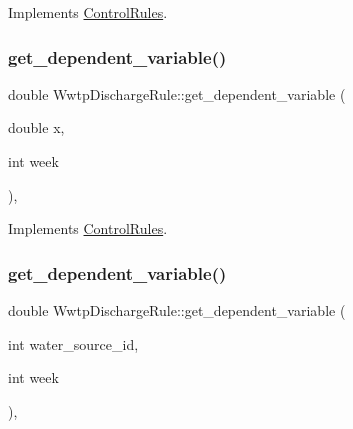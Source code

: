 Implements \mbox{\hyperlink{classControlRules_a56a42b40bf093237929a9c835dc9b772_a56a42b40bf093237929a9c835dc9b772}{Control\+Rules}}.

\mbox{\label{classWwtpDischargeRule_a10eb6f901b6479dadc107e0a7c07e03b_a10eb6f901b6479dadc107e0a7c07e03b}} 
\subsubsection{\texorpdfstring{get\+\_\+dependent\+\_\+variable()}{get\_dependent\_variable()}\hspace{0.1cm}{\footnotesize\ttfamily [3/4]}}
{\footnotesize\ttfamily double Wwtp\+Discharge\+Rule\+::get\+\_\+dependent\+\_\+variable (\begin{DoxyParamCaption}\item[{double}]{x,  }\item[{int}]{week }\end{DoxyParamCaption})\hspace{0.3cm}{\ttfamily [override]}, {\ttfamily [virtual]}}



Implements \mbox{\hyperlink{classControlRules_a4c5a86844c3d6409bfa0ba2b058f82e7_a4c5a86844c3d6409bfa0ba2b058f82e7}{Control\+Rules}}.

\mbox{\label{classWwtpDischargeRule_a8eade5d595ec0fdc76769e67c7ffc5f4_a8eade5d595ec0fdc76769e67c7ffc5f4}} 
\subsubsection{\texorpdfstring{get\+\_\+dependent\+\_\+variable()}{get\_dependent\_variable()}\hspace{0.1cm}{\footnotesize\ttfamily [4/4]}}
{\footnotesize\ttfamily double Wwtp\+Discharge\+Rule\+::get\+\_\+dependent\+\_\+variable (\begin{DoxyParamCaption}\item[{int}]{water\+\_\+source\+\_\+id,  }\item[{int}]{week }\end{DoxyParamCaption})\hspace{0.3cm}{\ttfamily [override]}, {\ttfamily [virtual]}}

